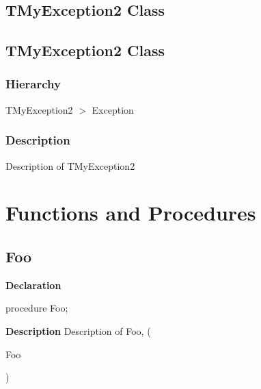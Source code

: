 \documentclass{report}
\newif\ifpdf
\begin{document}
\subsection*{\large{\textbf{TMyException2 Class}}\normalsize\hspace{1ex}\hrulefill}
\else
\subsection*{TMyException2 Class}
\fi
\label{ok_back_comment.TMyException2}
\subsubsection*{\large{\textbf{Hierarchy}}\normalsize\hspace{1ex}\hfill}
TMyException2 {$>$} Exception
\subsubsection*{\large{\textbf{Description}}\normalsize\hspace{1ex}\hfill}
Description of TMyException2\section{Functions and Procedures}
\ifpdf
\subsection*{\large{\textbf{Foo}}\normalsize\hspace{1ex}\hrulefill}
\else
\subsection*{Foo}
\fi
\label{ok_back_comment-Foo}
\begin{list}{}{
\setlength{\itemindent}{0cm}
\setlength{\listparindent}{0cm}
\setlength{\leftmargin}{\evensidemargin}
\addtolength{\leftmargin}{\tmplength}
\settowidth{\labelsep}{X}
\addtolength{\leftmargin}{\labelsep}
\setlength{\labelwidth}{\tmplength}
}
\item[\textbf{Declaration}\hfill]
\ifpdf
\begin{flushleft}
\fi
\begin{ttfamily}
procedure Foo;\end{ttfamily}

\ifpdf
\end{flushleft}
\fi

\par
\item[\textbf{Description}]
Description of Foo, (\begin{ttfamily}Foo\end{ttfamily})

\end{list}
\end{document}
